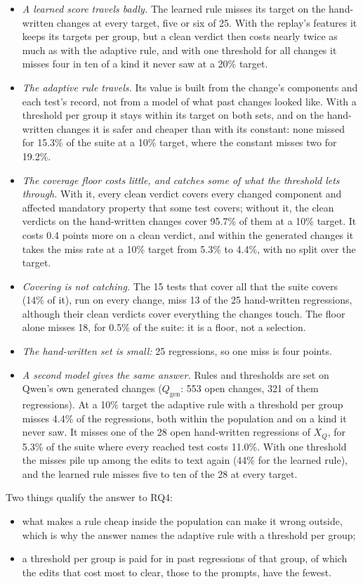 \documentclass[11pt,a4paper]{article}
\begin{document}
\begin{itemize}
  \item \emph{A learned score travels badly.} The learned rule misses its target on the hand-written changes at
        every target, five or six of 25. With the replay's features it keeps its targets per group, but a clean
        verdict then costs nearly twice as much as with the adaptive rule, and with one threshold for all changes
        it misses four in ten of a kind it never saw at a 20\% target.
  \item \emph{The adaptive rule travels.} Its value is built from the change's components and each test's record,
        not from a model of what past changes looked like. With a threshold per group it stays within its target
        on both sets, and on the hand-written changes it is safer and cheaper than with its constant: none missed
        for 15.3\% of the suite at a 10\% target, where the constant misses two for 19.2\%.
  \item \emph{The coverage floor costs little, and catches some of what the threshold lets through.} With it,
        every clean verdict covers every changed component and affected mandatory property that some test covers;
        without it, the clean verdicts on the hand-written changes cover 95.7\% of them at a 10\% target. It costs
        0.4 points more on a clean verdict, and within the generated changes it takes the miss rate at a 10\%
        target from 5.3\% to 4.4\%, with no split over the target.
  \item \emph{Covering is not catching.} The 15 tests that cover all that the suite covers (14\% of it), run on
        every change, miss 13 of the 25 hand-written regressions, although their clean verdicts cover everything
        the changes touch. The floor alone misses 18, for 0.5\% of the suite: it is a floor, not a selection.
  \item \emph{The hand-written set is small:} 25 regressions, so one miss is four points.
  \item \emph{A second model gives the same answer.} Rules and thresholds are set on Qwen's own generated changes
        ($Q_{\mathrm{gen}}$: 553 open changes, 321 of them regressions). At a 10\% target the adaptive rule with a
        threshold per group misses 4.4\% of the regressions, both within the population and on a kind it never
        saw. It misses one of the 28 open hand-written regressions of $X_Q$, for 5.3\% of the suite where every
        reached test costs 11.0\%. With one threshold the misses pile up among the edits to text again (44\% for
        the learned rule), and the learned rule misses five to ten of the 28 at every target.
\end{itemize}
Two things qualify the answer to RQ4:
\begin{itemize}
  \item what makes a rule cheap inside the population can make it wrong outside, which is why the answer names
        the adaptive rule with a threshold per group;
  \item a threshold per group is paid for in past regressions of that group, of which the edits that cost most to
        clear, those to the prompts, have the fewest.
\end{itemize}
\end{document}
